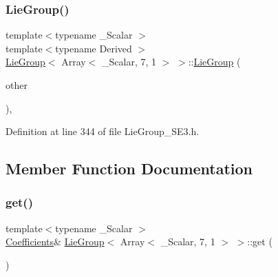 \subsubsection{\texorpdfstring{Lie\+Group()}{LieGroup()}\hspace{0.1cm}{\footnotesize\ttfamily [6/6]}}
{\footnotesize\ttfamily template$<$typename \+\_\+\+Scalar $>$ \\
template$<$typename Derived $>$ \\
\hyperlink{class_lie_group}{Lie\+Group}$<$ Array$<$ \+\_\+\+Scalar, 7, 1 $>$ $>$\+::\hyperlink{class_lie_group}{Lie\+Group} (\begin{DoxyParamCaption}\item[{const Matrix\+Base$<$ Derived $>$ \&}]{other }\end{DoxyParamCaption})\hspace{0.3cm}{\ttfamily [inline]}, {\ttfamily [explicit]}}



Definition at line 344 of file Lie\+Group\+\_\+\+S\+E3.\+h.



\subsection{Member Function Documentation}
\hypertarget{class_lie_group_3_01_array_3_01___scalar_00_017_00_011_01_4_01_4_ac1572d622034e7582584d2f01aa76e8e}{}\label{class_lie_group_3_01_array_3_01___scalar_00_017_00_011_01_4_01_4_ac1572d622034e7582584d2f01aa76e8e} 
\subsubsection{\texorpdfstring{get()}{get()}\hspace{0.1cm}{\footnotesize\ttfamily [1/2]}}
{\footnotesize\ttfamily template$<$typename \+\_\+\+Scalar $>$ \\
\hyperlink{class_lie_group_3_01_array_3_01___scalar_00_017_00_011_01_4_01_4_aa5d0fac468a8bdbb468bf2218b93ee0e}{Coefficients}\& \hyperlink{class_lie_group}{Lie\+Group}$<$ Array$<$ \+\_\+\+Scalar, 7, 1 $>$ $>$\+::get (\begin{DoxyParamCaption}{ }\end{DoxyParamCaption})\hspace{0.3cm}{\ttfamily [inline]}}

